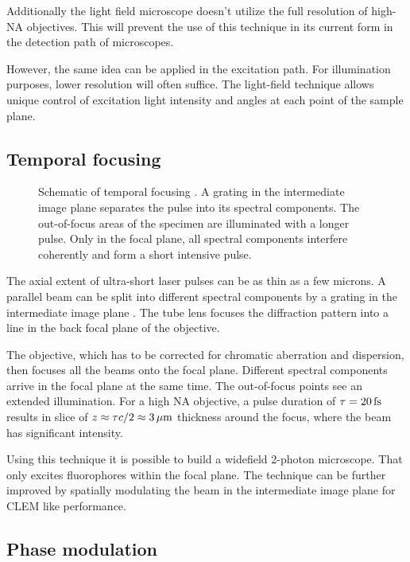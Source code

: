 Additionally the light field microscope doesn't utilize the full
resolution of high-NA objectives. This will prevent the use of this
technique in its current form in the detection path of microscopes.

However, the same idea can be applied in the excitation path. For
illumination purposes, lower resolution will often suffice. The
light-field technique allows unique control of excitation light
intensity and angles at each point of the sample plane.

\subsection{Temporal focusing}
\begin{figure}[!hbt]
  \centering
  
  \caption{Schematic of temporal focusing \citep[inspired
    from][]{Oron2005}. A grating in the intermediate image plane
    separates the pulse into its spectral components. The out-of-focus
    areas of the specimen are illuminated with a longer pulse. Only in
    the focal plane, all spectral components interfere coherently and
    form a short intensive pulse.}
  \label{fig:oron}
\end{figure}
The axial extent of ultra-short laser pulses can be as thin as a few
microns. A parallel beam can be split into different spectral
components by a grating in the intermediate image plane
\citep{Oron2005}. The tube lens focuses the diffraction pattern into a
line in the back focal plane of the objective.

The objective, which has to be corrected for chromatic aberration and
dispersion, then focuses all the beams onto the focal plane. Different
spectral components arrive in the focal plane at the same time. The
out-of-focus points see an extended illumination. For a high NA
objective, a pulse duration of $\tau=\unit[20]{fs}$ results in slice
of $z\approx\tau c/2\approx\unit[3]{\mu m}$ thickness around the
focus, where the beam has significant intensity.

Using this technique it is possible to build a widefield 2-photon
microscope. That only excites fluorophores within the focal plane. The
technique can be further improved by spatially modulating the beam
in the intermediate image plane for CLEM like performance.

\subsection{Phase modulation}
